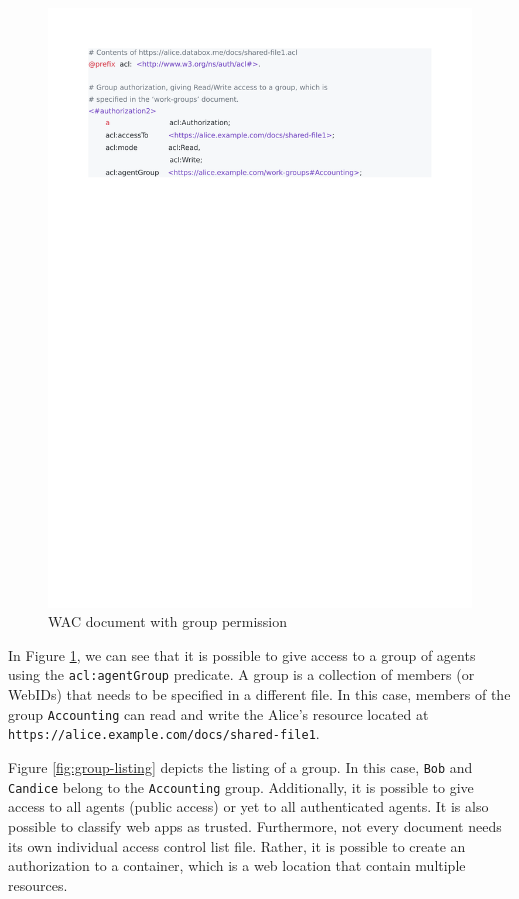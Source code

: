 \documentclass[sigconf]{acmart}
\def\code#1{\texttt{#1}}
\begin{document}
\begin{figure}
  \includegraphics[trim=2cm 21.2cm 4.7cm 2cm, clip, scale=0.57]{pdf/shared-file1}
  \caption{WAC document with group permission}
  \label{fig:group-permission}
\end{figure}

In Figure \ref{fig:group-permission}, we can see that it is possible to give access to a group of agents using the \code{acl:agentGroup} predicate. A group is a collection of members (or WebIDs) that needs to be specified in a different file. In this case, members of the group \code{Accounting} can read and write the Alice's resource located at \code{https://alice.example.com/docs/shared-file1}.

Figure \ref{fig:group-listing} depicts the listing of a group. In this case, \code{Bob} and \code{Candice} belong to the \code{Accounting} group. Additionally, it is possible to give access to all agents (public access) or yet to all authenticated agents. It is also possible to classify web apps as trusted. Furthermore, not every document needs its own individual access control list file. Rather, it is possible to create an authorization to a container, which is a web location that contain multiple resources.
\end{document}
